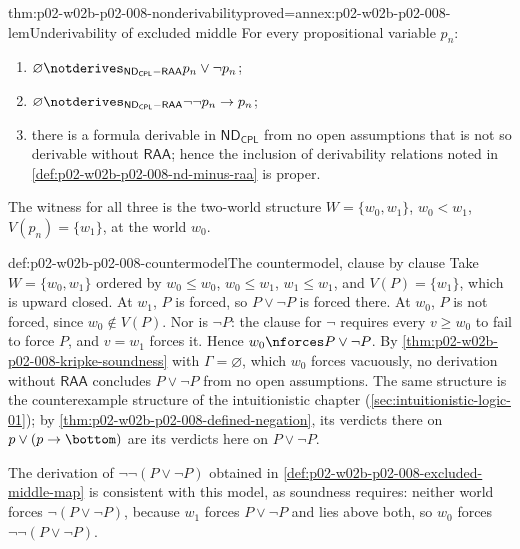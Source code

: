 \begin{hbcorollary}{thm:p02-w02b-p02-008-nonderivability}{proved=annex:p02-w02b-p02-008-lem}{Underivability of excluded middle}
For every propositional variable \(p_n\):
\begin{enumerate}
  \item
  \(\varnothing\notderives_{\mathsf{ND}_{\mathsf{CPL}}-\mathsf{RAA}}p_n\lor\neg p_n\);
  \item
  \(\varnothing\notderives_{\mathsf{ND}_{\mathsf{CPL}}-\mathsf{RAA}}\neg\neg p_n\to p_n\);
  \item there is a formula derivable in \(\mathsf{ND}_{\mathsf{CPL}}\) from
        no open assumptions that is not so derivable without
        \(\mathsf{RAA}\); hence the inclusion of derivability relations
        noted in \cref{def:p02-w02b-p02-008-nd-minus-raa} is proper.
\end{enumerate}
The witness for all three is the two-world structure
\(W=\{w_0,w_1\}\), \(w_0<w_1\), \(V(p_n)=\{w_1\}\), at the world \(w_0\).
\end{hbcorollary}

\begin{hbexample}{def:p02-w02b-p02-008-countermodel}{The countermodel, clause by clause}
Take \(W=\{w_0,w_1\}\) ordered by \(w_0\leq w_0\), \(w_0\leq w_1\),
\(w_1\leq w_1\), and \(V(P)=\{w_1\}\), which is upward closed.  At \(w_1\),
\(P\) is forced, so \(P\lor\neg P\) is forced there.  At \(w_0\), \(P\) is not
forced, since \(w_0\notin V(P)\).  Nor is \(\neg P\): the clause for
\(\neg\) requires every \(v\geq w_0\) to fail to force \(P\), and
\(v=w_1\) forces it.  Hence \(w_0\nforces P\lor\neg P\).  By
\cref{thm:p02-w02b-p02-008-kripke-soundness} with \(\Gamma=\varnothing\),
which \(w_0\) forces vacuously, no derivation without \(\mathsf{RAA}\)
concludes \(P\lor\neg P\) from no open assumptions.  The same structure is
the counterexample structure of the intuitionistic chapter
(\cref{sec:intuitionistic-logic-01}); by
\cref{thm:p02-w02b-p02-008-defined-negation}, its verdicts there on
\(p\lor(p\to\bottom)\) are its verdicts here on \(P\lor\neg P\).

The derivation of \(\neg\neg(P\lor\neg P)\) obtained in
\cref{def:p02-w02b-p02-008-excluded-middle-map} is consistent with this
model, as soundness requires: neither world forces \(\neg(P\lor\neg P)\),
because \(w_1\) forces \(P\lor\neg P\) and lies above both, so \(w_0\)
forces \(\neg\neg(P\lor\neg P)\).
\end{hbexample}


